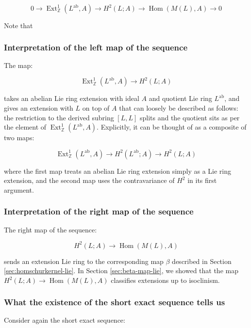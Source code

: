 \documentclass{ucetd}
\begin{document}
\begin{equation}\label{eq:ses-uct-lie}
  0 \to \operatorname{Ext}^1_{\mathbb{Z}}(L^{\operatorname{ab}},A) \to H^2(L;A) \to \operatorname{Hom}(M(L),A) \to 0
\end{equation}

Note that 
\subsubsection{Interpretation of the left map of the sequence}\label{sec:ses-uct-lie-left-map}

The map:

$$\operatorname{Ext}^1_{\mathbb{Z}}(L^{\operatorname{ab}},A) \to H^2(L;A)$$

takes an abelian Lie ring extension with ideal $A$ and quotient Lie
ring $L^{\operatorname{ab}}$, and gives an extension with $L$ on top
of $A$ that can loosely be described as follows: the restriction to
the derived subring $[L,L]$ splits and the quotient sits as per the
element of
$\operatorname{Ext}^1_{\mathbb{Z}}(L^{\operatorname{ab}},A)$. Explicitly,
it can be thought of as a composite of two maps:

$$\operatorname{Ext}^1_{\mathbb{Z}}(L^{\operatorname{ab}},A) \to H^2(L^{\operatorname{ab}};A) \to H^2(L;A)$$

where the first map treats an abelian Lie ring extension simply as a
Lie ring extension, and the second map uses the contravariance of $H^2$
in its first argument.

\subsubsection{Interpretation of the right map of the sequence}\label{sec:ses-uct-lie-right-map}

The right map of the sequence:

$$H^2(L;A) \to \operatorname{Hom}(M(L),A)$$

sends an extension Lie ring to the corresponding map $\beta$ described in
Section \ref{sec:homschurkernel-lie}. In Section \ref{sec:beta-map-lie}, we
showed that the map $H^2(L;A) \to \operatorname{Hom}(M(L),A)$
classifies extensions up to isoclinism.

\subsubsection{What the existence of the short exact sequence tells us}

Consider again the short exact sequence:
\end{document}
